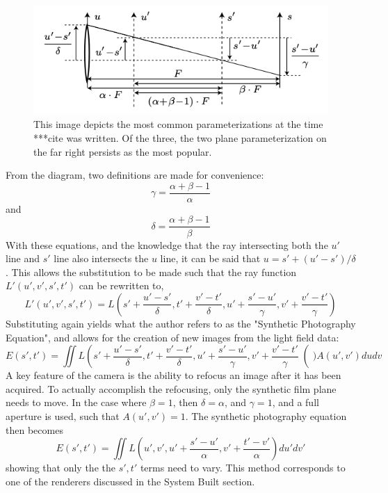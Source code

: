 \documentclass[12pt]{report}
\begin{document}
\begin{figure}[!ht]
	\centering
	\includegraphics[scale=0.75]{reference_geometry.png}
	\caption{This image depicts the most common parameterizations at the time ***cite was written. Of the three, the two plane parameterization on the far right persists as the most popular.}
	\label{fig:reference_geometry}
\end{figure}
From the diagram, two definitions are made for convenience:
\begin{equation}
\gamma=\frac{\alpha + \beta - 1}{\alpha}
\end{equation}
and
\begin{equation}
\delta = \frac{\alpha + \beta - 1}{\beta}
\end{equation}
With these equations, and the knowledge that the ray intersecting both the $u'$ line and $s'$ line also intersects the $u$ line, it can be said that $u = s'+(u'-s')/\delta$. This allows the substitution to be made such that the ray function $L'(u',v',s',t')$ can be rewritten to,
\begin{equation}
L'(u',v',s',t')=L \left( s'+\frac{u'-s'}{\delta}, t' + \frac{v'-t'}{\delta}, u'+\frac{s'-u'}{\gamma}, v'+\frac{v'-t'}{\gamma} \right)
\end{equation}
Substituting again yields what the author refers to as the "Synthetic Photography Equation", and allows for the creation of new images from the light field data:
\begin{equation}
E(s',t')=\iint L \left( s'+\frac{u'-s'}{\delta}, t' + \frac{v'-t'}{\delta}, u'+\frac{s'-u'}{\gamma}, v'+\frac{v'-t'}{\gamma} \right() A(u',v')dudv
\end{equation}
A key feature of the camera is the ability to refocus an image after it has been acquired. To actually accomplish the refocusing, only the synthetic film plane needs to move. In the case where $\beta = 1$, then $\delta = \alpha$, and $\gamma = 1$, and a full aperture is used, such that $A(u',v') = 1$. The synthetic photography equation then becomes 
\begin{equation}
E(s',t') = \iint L \left( u', v', u'+\frac{s'-u'}{\alpha}, v'+ \frac{t'-v'}{\alpha} \right)du'dv'
\end{equation}
showing that only the the $s',t'$ terms need to vary. This method corresponds to one of the renderers discussed in the System Built section.
\end{document}
